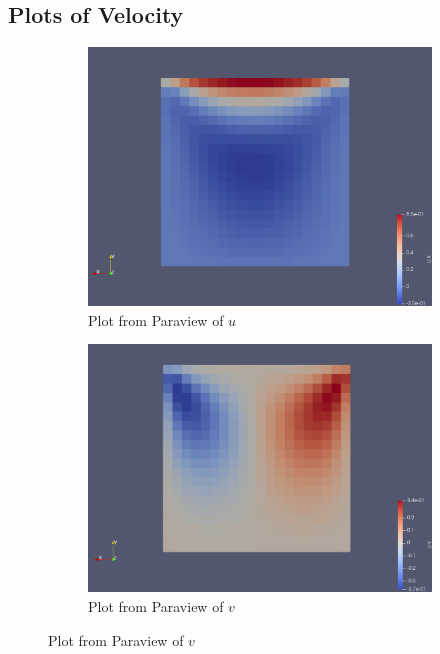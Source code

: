 \documentclass[11pt]{article}
\begin{document}
\subsection{Plots of Velocity}
\begin{figure}[H]
   \centering
   \begin{subfigure}{0.495\linewidth}
      \includegraphics[width=\textwidth]{images/ux_paraview.png}
      \caption{Plot from Paraview of $u$}
   \end{subfigure}
   \begin{subfigure}{0.495\linewidth}
      \includegraphics[width=\textwidth]{images/uy_paraview.png}
      \caption{Plot from Paraview of $v$}
   \end{subfigure}      
   \label{paraviewplots}
\end{figure}
\end{document}

